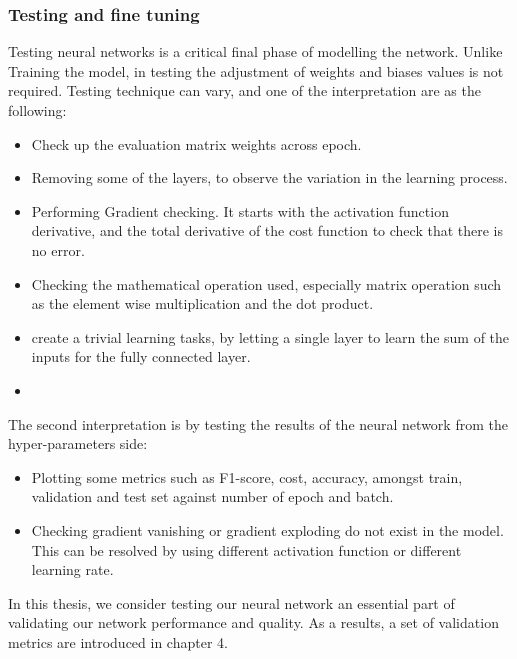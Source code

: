 \subsubsection{Testing and fine tuning}
\hspace{5mm} Testing neural networks is a critical final phase of modelling the network. Unlike Training the model, in testing the adjustment of weights and biases values is not required. Testing technique can vary, and one of the interpretation are as the following:
\begin{itemize}
    \item Check up the evaluation matrix weights across epoch.
    \item Removing some of the layers, to observe the variation in the learning process.
    \item Performing Gradient checking. It starts with the activation function derivative, and the total derivative of the cost function to check that there is no error.
    \item Checking the mathematical operation used, especially matrix operation such as the element wise multiplication and the dot product.
    \item create a trivial learning tasks, by letting a single layer to learn the sum of the inputs for the fully connected layer. 
    \item 
\end{itemize}
\hspace{5mm} The second interpretation is by testing the results of the neural network from the hyper-parameters side:
\begin{itemize}
    \item Plotting some metrics such as F1-score, cost, accuracy, amongst train, validation and test set against number of epoch and batch.
    \item Checking gradient vanishing or gradient exploding do not exist in the model. This can be resolved by using different activation function or different learning rate.
\end{itemize}
\hspace{5mm} In this thesis, we consider testing our neural network an essential part of validating our network performance and quality. As a results, a set of validation metrics are introduced in chapter 4. 
